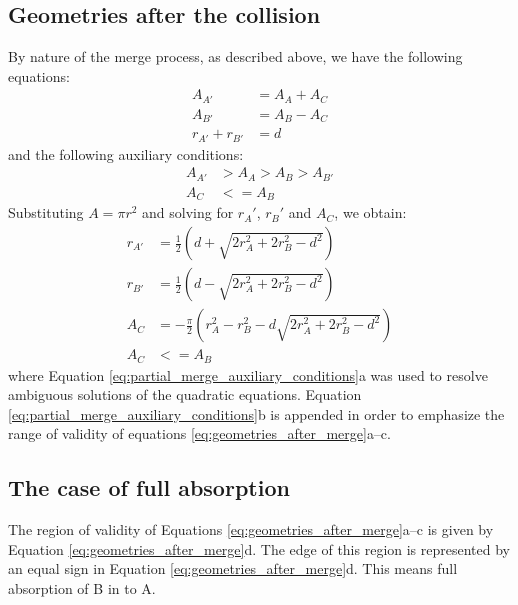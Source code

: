 \documentclass{article}
\begin{document}
\subsection{Geometries after the collision}
By nature of the merge process, as described above, we have the following equations:
\begin{equation}
\label{eq:partial_merge_geometrical_relations}
\begin{split}
A_{A'} &= A_A + A_C\\
A_{B'} &= A_B - A_C\\
r_{A'} + r_{B'} &= d
\end{split}
\end{equation}
%
and the following auxiliary conditions:
%
\begin{equation}
\label{eq:partial_merge_auxiliary_conditions}
\begin{split}
A_{A'} &> A_A > A_B > A_{B'}\\
A_C &<= A_B
\end{split}
\end{equation}
Substituting $A = \pi r^2$ and solving for $r_A'$, $r_B'$ and $A_C$, we obtain:
\begin{equation}
\label{eq:geometries_after_merge}
\begin{split}
r_{A'} &= \frac{1}{2}\left(d + \sqrt{2r_A^2 + 2r_B^2 - d^2}\right)\\
r_{B'} &= \frac{1}{2}\left(d - \sqrt{2r_A^2 + 2r_B^2 - d^2}\right)\\
A_C &= -\frac{\pi}{2}\left(r_A^2 - r_B^2 - d\sqrt{2r_A^2 + 2r_B^2 - d^2}\right)\\
A_C &<= A_B
\end{split}
\end{equation}
where Equation \ref{eq:partial_merge_auxiliary_conditions}a was used to resolve ambiguous solutions of the quadratic equations. Equation \ref{eq:partial_merge_auxiliary_conditions}b is appended in order to emphasize the range of validity of equations \ref{eq:geometries_after_merge}a--c.

\subsection{The case of full absorption}
The region of validity of Equations \ref{eq:geometries_after_merge}a--c is given by Equation \ref{eq:geometries_after_merge}d. The edge of this region is represented by an equal sign in Equation \ref{eq:geometries_after_merge}d. This means full absorption of B in to A.
\end{document}
